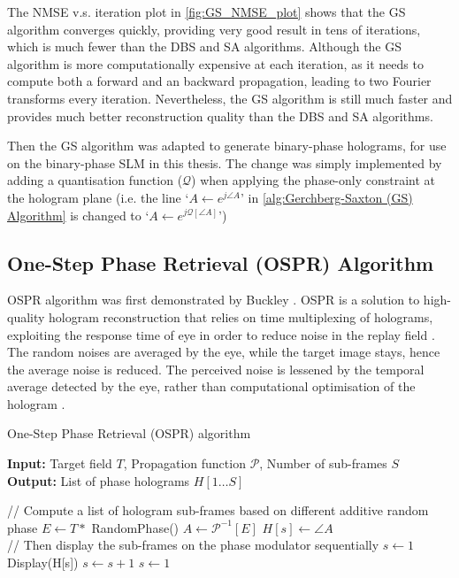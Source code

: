 The NMSE v.s. iteration plot in \cref{fig:GS_NMSE_plot} shows that the GS algorithm converges quickly, providing very good result in tens of iterations, which is much fewer than the DBS and SA algorithms. Although the GS algorithm is more computationally expensive at each iteration, as it needs to compute both a forward and an backward propagation, leading to two Fourier transforms every iteration. Nevertheless, the GS algorithm is still much faster and provides much better reconstruction quality than the DBS and SA algorithms.

Then the GS algorithm was adapted to generate binary-phase holograms, for use on the binary-phase SLM in this thesis. The change was simply implemented by adding a quantisation function ($\mathcal{Q}$) when applying the phase-only constraint at the hologram plane (i.e. the line `$A \gets e^{j\angle A}$' in \cref{alg:Gerchberg-Saxton (GS) Algorithm} is changed to `$A \gets e^{j\mathcal{Q}[\angle A]}$')


\subsection{One-Step Phase Retrieval (OSPR) Algorithm}\label{sec:One Step Phase Retrieval (OSPR) Algorithm}
OSPR algorithm was first demonstrated by Buckley \cite{Buckley2006}. OSPR is a solution to high-quality hologram reconstruction that relies on time multiplexing of holograms, exploiting the response time of eye in order to reduce noise in the replay field \cite{Cable2006}. The random noises are averaged by the eye, while the target image stays, hence the average noise is reduced. The perceived noise is lessened by the temporal average detected by the eye, rather than computational optimisation of the hologram \cite{Cable2006}.
\begin{algorithm}[H]
  \caption{One-Step Phase Retrieval (OSPR) algorithm}\label{alg:One Step Phase Retrieval (OSPR) Algorithm}
  \textbf{Input:} Target field $T$, Propagation function $\mathcal{P}$, Number of sub-frames $S$ \\
  \textbf{Output:} List of phase holograms $H[1\ldots S]$
  \begin{algorithmic}
    \State // Compute a list of hologram sub-frames based on different additive random phase
    \State $E \gets T * $ RandomPhase()
    \State $A \gets \mathcal{P}^{-1}[E]$
    \State $H[s] \gets \angle A$
    \EndFor\\
    \State // Then display the sub-frames on the phase modulator sequentially
    \State $s\gets 1$
    \State Display(H[s])
    \State $s\gets s + 1$
    \State $s\gets 1$
    \EndIf
    \EndWhile
  \end{algorithmic}
\end{algorithm}


